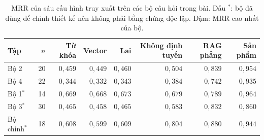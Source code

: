 \begin{table}[H]
\centering
\caption{MRR của sáu cấu hình truy xuất trên các bộ câu hỏi trong bài. Dấu $^{*}$: bộ đã dùng để chỉnh thiết kế nên không phải bằng chứng độc lập. Đậm: MRR cao nhất của bộ.}\label{tab:rag-mrr}
\footnotesize
\begin{tabular}{lrrrrrrr}
\toprule
Tập & $n$ & Từ khóa & Vector & Lai & Không định tuyến & RAG phẳng & Sản phẩm \\
\midrule
Bộ 2 & 20 & $0{,}459$ & $0{,}449$ & $0{,}460$ & $0{,}504$ & $0{,}839$ & \textbf{$0{,}954$} \\
Bộ 4 & 22 & $0{,}344$ & $0{,}332$ & $0{,}343$ & $0{,}384$ & $0{,}742$ & \textbf{$0{,}935$} \\
Bộ 1$^{*}$ & 14 & $0{,}669$ & $0{,}668$ & $0{,}673$ & $0{,}679$ & $0{,}789$ & \textbf{$0{,}964$} \\
Bộ 3$^{*}$ & 30 & $0{,}465$ & $0{,}458$ & $0{,}465$ & $0{,}583$ & $0{,}832$ & \textbf{$0{,}860$} \\
Bộ chỉnh$^{*}$ & 18 & $0{,}608$ & $0{,}599$ & $0{,}609$ & $0{,}804$ & $0{,}880$ & \textbf{$0{,}944$} \\
\bottomrule
\end{tabular}
\end{table}
